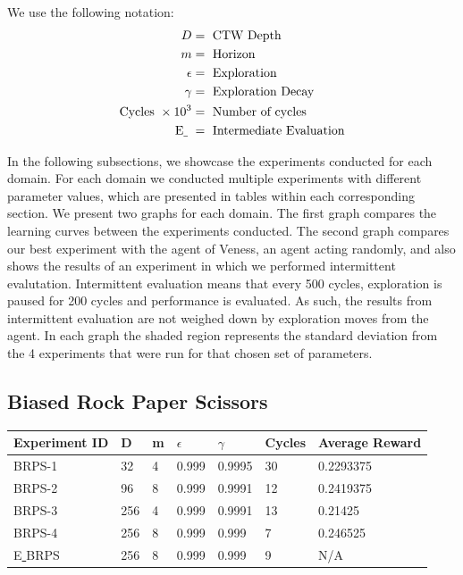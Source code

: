 \documentclass{article}
\theoremstyle{definition}
\newtheorem{primary statistics}[definition]{Primary Statistics}
\newtheorem{auxiliary statistics}[definition]{Auxiliary Statistics}
\begin{document}
We use the following notation:
 \begin{align*}
     D &= \text{ CTW Depth} \\
     m &= \text{ Horizon} \\
     \epsilon &= \text{ Exploration} \\
     \gamma &= \text{ Exploration Decay} \\
     \text{Cycles }\times 10^3 &= \text{ Number of cycles }  \\
     \text{E\underline{ } } &= \text{ Intermediate Evaluation}
 \end{align*}

In the following subsections, we showcase the experiments conducted for each domain. For each domain we conducted multiple experiments with different parameter values, which are presented in tables within each corresponding section. We present two graphs for each domain. The first graph compares the learning curves between the experiments conducted. The second graph compares our best experiment with the agent of Veness, an agent acting randomly, and also shows the results of an experiment in which we performed intermittent evalutation. Intermittent evaluation means that every 500 cycles, exploration is paused for 200 cycles and performance is evaluated. As such, the results from intermittent evaluation are not weighed down by exploration moves from the agent. In each graph the shaded region represents the standard deviation from the 4 experiments that were run for that chosen set of parameters.

\newpage

\subsection{Biased Rock Paper Scissors}
\begin{tabular}{|l|l|l|l|l|l|l|}
\hline \centering
 Experiment ID& D & m & $\epsilon$ & $\gamma$ & Cycles & Average Reward \\ \hline
BRPS-1        & 32        & 4           & 0.999       & 0.9995            & 30     & 0.2293375        \\ \hline
BRPS-2        & 96        & 8           & 0.999       & 0.9991            & 12     & 0.2419375       \\ \hline
BRPS-3        & 256       & 4           & 0.999       & 0.9991            & 13     & 0.21425        \\ \hline
BRPS-4        & 256       & 8           & 0.999       & 0.999             & 7      & 0.246525  \\ \hline  
E\underline{ }BRPS        & 256       & 8           & 0.999       & 0.999             & 9      & N/A  \\ \hline      
\end{tabular}  \\
\end{document}
